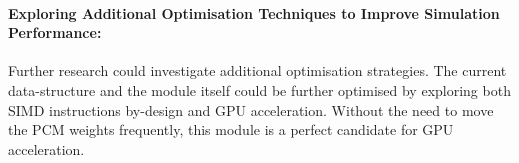 \paragraph{Exploring Additional Optimisation Techniques to Improve Simulation Performance:} Further research could investigate additional optimisation strategies.
  The current data-structure and the module itself could be further optimised by exploring both SIMD instructions by-design and GPU acceleration. 
  Without the need to move the PCM weights frequently, this module is a perfect candidate for GPU acceleration.\\
